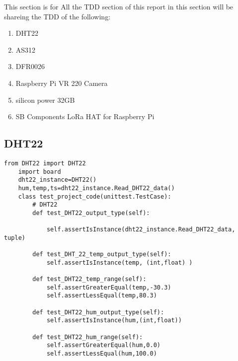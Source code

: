 This section is  for All  the TDD section of  this  report in this  section will be  shareing the TDD of the following:
\begin{enumerate}
    \item DHT22
    \item AS312
    \item DFR0026
    \item Raspberry Pi VR 220 Camera
    \item silicon power 32GB
    \item SB Components LoRa HAT for Raspberry Pi
\end{enumerate}
\subsection{DHT22}
\begin{lstlisting}[style=mystyle,caption={DHT22 unit test}]
    from DHT22 import DHT22
    import board
    dht22_instance=DHT22()
    hum,temp,ts=dht22_instance.Read_DHT22_data()
    class test_project_code(unittest.TestCase):
        # DHT22
        def test_DHT22_output_type(self):
           
            self.assertIsInstance(dht22_instance.Read_DHT22_data, tuple)
    
        def test_DHT_22_temp_output_type(self):
            self.assertIsInstance(temp, (int,float) )
    
        def test_DHT22_temp_range(self):
            self.assertGreaterEqual(temp,-30.3)
            self.assertLessEqual(temp,80.3)
    
        def test_DHT22_hum_output_type(self):
            self.assertIsInstance(hum,(int,float))
    
        def test_DHT22_hum_range(self):
            self.assertGreaterEqual(hum,0.0)
            self.assertLessEqual(hum,100.0)  
\end{lstlisting}
\newpage
\